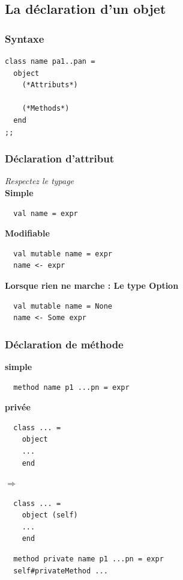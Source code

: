 \subsection{La déclaration d'un objet} %
\begin{frame}[fragile]
	\frametitle{Syntaxe}
	\begin{lstlisting}
class name pa1..pan =
  object
    (*Attributs*)
    
    (*Methods*)
  end
;;
	\end{lstlisting}
\end{frame}

\begin{frame}[fragile]
	\frametitle{Déclaration d'attribut}
	\textit{Respectez le typage}\\
	\textbf{Simple}
	\begin{lstlisting}
  val name = expr
	\end{lstlisting}
	\textbf{Modifiable}
	\begin{lstlisting}
  val mutable name = expr
  name <- expr
	\end{lstlisting}
	\textbf{Lorsque rien ne marche : Le type Option}
	\begin{lstlisting}
  val mutable name = None
  name <- Some expr
	\end{lstlisting}
\end{frame}

\begin{frame}[fragile]
	\frametitle{Déclaration de méthode}
	\textbf{simple}
	\begin{lstlisting}
  method name p1 ...pn = expr
	\end{lstlisting}
	\textbf{privée}\\
	\begin{minipage}{0.4\textwidth}
  	\begin{lstlisting}
  class ... =
    object
    ...
    end
		\end{lstlisting}
	\end{minipage}$\Rightarrow$
	\begin{minipage}{0.4\textwidth}
		\begin{lstlisting}
  class ... =
    object (self)
    ...
    end
		\end{lstlisting}
	\end{minipage}
	\begin{lstlisting}
  method private name p1 ...pn = expr
  self#privateMethod ...
	\end{lstlisting}
\end{frame}

